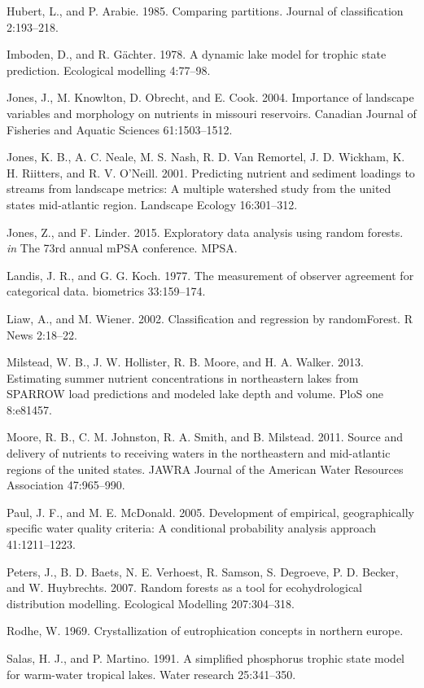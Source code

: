 \documentclass[12pt,]{article}
\begin{document}
Hubert, L., and P. Arabie. 1985. Comparing partitions. Journal of
classification 2:193--218.

Imboden, D., and R. G{ä}chter. 1978. A dynamic lake model for trophic
state prediction. Ecological modelling 4:77--98.

Jones, J., M. Knowlton, D. Obrecht, and E. Cook. 2004. Importance of
landscape variables and morphology on nutrients in missouri reservoirs.
Canadian Journal of Fisheries and Aquatic Sciences 61:1503--1512.

Jones, K. B., A. C. Neale, M. S. Nash, R. D. Van Remortel, J. D.
Wickham, K. H. Riitters, and R. V. O'Neill. 2001. Predicting nutrient
and sediment loadings to streams from landscape metrics: A multiple
watershed study from the united states mid-atlantic region. Landscape
Ecology 16:301--312.

Jones, Z., and F. Linder. 2015. Exploratory data analysis using random
forests. \emph{in} The 73rd annual mPSA conference. MPSA.

Landis, J. R., and G. G. Koch. 1977. The measurement of observer
agreement for categorical data. biometrics 33:159--174.

Liaw, A., and M. Wiener. 2002. Classification and regression by
randomForest. R News 2:18--22.

Milstead, W. B., J. W. Hollister, R. B. Moore, and H. A. Walker. 2013.
Estimating summer nutrient concentrations in northeastern lakes from
SPARROW load predictions and modeled lake depth and volume. PloS one
8:e81457.

Moore, R. B., C. M. Johnston, R. A. Smith, and B. Milstead. 2011. Source
and delivery of nutrients to receiving waters in the northeastern and
mid-atlantic regions of the united states. JAWRA Journal of the American
Water Resources Association 47:965--990.

Paul, J. F., and M. E. McDonald. 2005. Development of empirical,
geographically specific water quality criteria: A conditional
probability analysis approach 41:1211--1223.

Peters, J., B. D. Baets, N. E. Verhoest, R. Samson, S. Degroeve, P. D.
Becker, and W. Huybrechts. 2007. Random forests as a tool for
ecohydrological distribution modelling. Ecological Modelling
207:304--318.

Rodhe, W. 1969. Crystallization of eutrophication concepts in northern
europe.

Salas, H. J., and P. Martino. 1991. A simplified phosphorus trophic
state model for warm-water tropical lakes. Water research 25:341--350.
\end{document}
